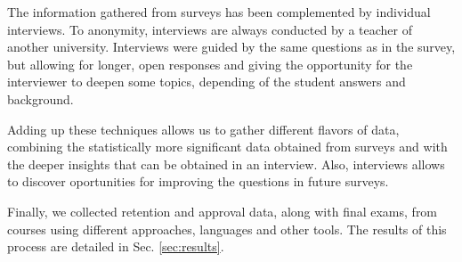 The information gathered from surveys has been complemented by individual interviews.
To anonymity, interviews are always conducted by a teacher of another university.
Interviews were guided by the same questions as in the survey, 
but allowing for longer, open responses 
and giving the opportunity for the interviewer to deepen some topics, 
depending of the student answers and background.



Adding up these techniques allows us to gather different flavors of data, 
combining the statistically more significant data obtained from surveys and 
with the deeper insights that can be obtained in an interview.
Also, interviews allows to discover oportunities for improving the questions in future surveys.

Finally, we collected retention and approval data, along with final exams,
from courses using different approaches, languages and other tools.
The results of this process are detailed in Sec. \ref{sec:results}.
